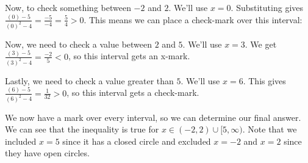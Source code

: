 {Now, to check something between $-2$ and $2$. We'll use $x=0$. Substituting gives $\frac{(0)-5}{(0)^2-4} = \frac{-5}{-4} =\frac{5}{4} >0$. This means we can place a check-mark over this interval:

\begin{center}
\label{fig:ineq_num_line5}
\end{center}

Now, we need to check a value between $2$ and $5$. We'll use $x=3$. We get $\frac{(3)-5}{(3)^2-4}=\frac{-2}{5} <0$, so this interval gets an x-mark.

\begin{center}
\label{fig:ineq_num_line6}
\end{center}

Lastly, we need to check a value greater than $5$. We'll use $x=6$. This gives $\frac{(6)-5}{(6)^2-4} = \frac{1}{32} >0$, so this interval gets a check-mark.

\begin{center}
\label{fig:ineq_num_line7}
\end{center}

We now have a mark over every interval, so we can determine our final answer. We can see that the inequality is true for $x \in (-2,2) \cup [5,\infty)$. Note that we included $x=5$ since it has a closed circle and excluded $x=-2$ and $x=2$ since they have open circles. }\\




